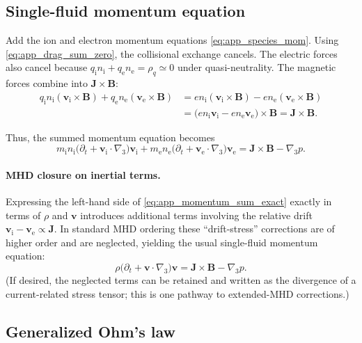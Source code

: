 \documentclass[11pt]{article}
\newcommand{\gradthree}{\nabla_3}
\newcommand{\ion}{\mathrm{i}}
\newcommand{\ele}{\mathrm{e}}
\begin{document}
\subsection{Single-fluid momentum equation}
\label{app:single_fluid_momentum}

Add the ion and electron momentum equations \eqref{eq:app_species_mom}. Using
\eqref{eq:app_drag_sum_zero}, the collisional exchange cancels. The electric forces also
cancel because \(q_\ion n_\ion + q_\ele n_\ele = \rho_q \simeq 0\) under quasi-neutrality.
The magnetic forces combine into \(\mathbf{J}\times\mathbf{B}\):
\begin{align}
q_\ion n_\ion(\mathbf{v}_\ion\times\mathbf{B}) + q_\ele n_\ele(\mathbf{v}_\ele\times\mathbf{B})
&=
e n_\ion(\mathbf{v}_\ion\times\mathbf{B}) - e n_\ele(\mathbf{v}_\ele\times\mathbf{B})
\nonumber\\
&= \big(e n_\ion\mathbf{v}_\ion - e n_\ele\mathbf{v}_\ele\big)\times\mathbf{B}
= \mathbf{J}\times\mathbf{B}.
\label{eq:app_JxB_identity}
\end{align}

Thus, the summed momentum equation becomes
\begin{equation}
m_\ion n_\ion\Big(\partial_t + \mathbf{v}_\ion\cdot\gradthree\Big)\mathbf{v}_\ion
+
m_\ele n_\ele\Big(\partial_t + \mathbf{v}_\ele\cdot\gradthree\Big)\mathbf{v}_\ele
=
\mathbf{J}\times\mathbf{B} - \gradthree p.
\label{eq:app_momentum_sum_exact}
\end{equation}

\paragraph{MHD closure on inertial terms.}
Expressing the left-hand side of \eqref{eq:app_momentum_sum_exact} exactly in terms of
\(\rho\) and \(\mathbf{v}\) introduces additional terms involving the relative drift
\(\mathbf{v}_\ion-\mathbf{v}_\ele \propto \mathbf{J}\). In standard MHD ordering these
``drift-stress'' corrections are of higher order and are neglected, yielding the usual
single-fluid momentum equation:
\begin{equation}
\rho\Big(\partial_t + \mathbf{v}\cdot\gradthree\Big)\mathbf{v}
=
\mathbf{J}\times\mathbf{B} - \gradthree p.
\label{eq:app_mhd_momentum}
\end{equation}
(If desired, the neglected terms can be retained and written as the divergence of a
current-related stress tensor; this is one pathway to extended-MHD corrections.)

\subsection{Generalized Ohm's law}
\label{app:ohm_law}
\end{document}

